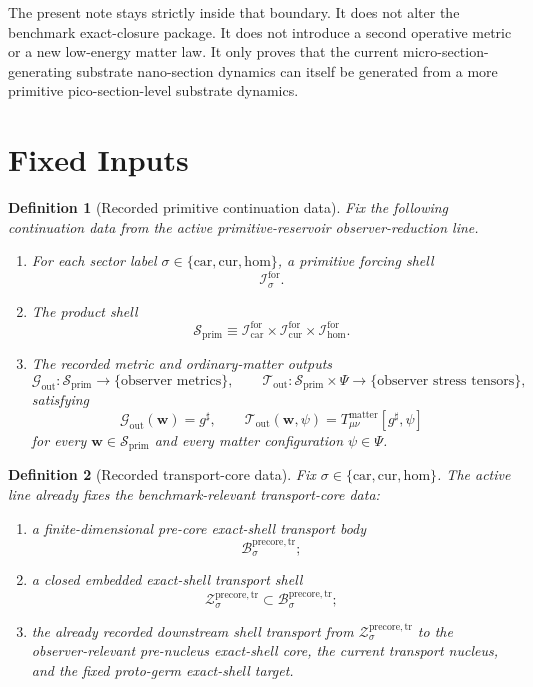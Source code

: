 \documentclass[11pt]{article}
\newcommand{\CompletedMetric}{g^{\sharp}}
\newcommand{\MatterSpace}{\Psi}
\newcommand{\Car}{\mathrm{car}}
\newcommand{\Cur}{\mathrm{cur}}
\newcommand{\Hom}{\mathrm{hom}}
\newcommand{\ForSpace}[1]{\mathcal I_{#1}^{\mathrm{for}}}
\newcommand{\PrimShell}{\mathcal S_{\mathrm{prim}}}
\newcommand{\MetricOut}{\mathscr G_{\mathrm{out}}}
\newcommand{\MatterOut}{\mathscr T_{\mathrm{out}}}
\newcommand{\PreCoreTrBody}[1]{\mathcal B_{#1}^{\mathrm{precore,tr}}}
\newcommand{\PreCoreTrShell}[1]{\mathcal Z_{#1}^{\mathrm{precore,tr}}}
\newtheorem{definition}{Definition}
\begin{document}
The present note stays strictly inside that boundary. It does not alter the benchmark exact-closure package. It does not introduce a second operative metric or a new low-energy matter law. It only proves that the current micro-section-generating substrate nano-section dynamics can itself be generated from a more primitive pico-section-level substrate dynamics.

\section{Fixed Inputs}

\begin{definition}[Recorded primitive continuation data]
\label{def:fixed}
Fix the following continuation data from the active primitive-reservoir observer-reduction line.
\begin{enumerate}
    \item For each sector label \(\sigma\in\{\Car,\Cur,\Hom\}\), a primitive forcing shell
    \[
    \ForSpace{\sigma}.
    \]
    \item The product shell
    \[
    \PrimShell
    \equiv
    \ForSpace{\Car}\times \ForSpace{\Cur}\times \ForSpace{\Hom}.
    \]
    \item The recorded metric and ordinary-matter outputs
    \[
    \MetricOut:\PrimShell\to\{\text{observer metrics}\},
    \qquad
    \MatterOut:\PrimShell\times\MatterSpace\to\{\text{observer stress tensors}\},
    \]
    satisfying
    \begin{equation}
    \MetricOut(\mathbf w)=\CompletedMetric,
    \qquad
    \MatterOut(\mathbf w,\psi)
    =
    T_{\mu\nu}^{\mathrm{matter}}[\CompletedMetric,\psi]
    \label{eq:fixedoutputs}
    \end{equation}
    for every \(\mathbf w\in\PrimShell\) and every matter configuration \(\psi\in\MatterSpace\).
\end{enumerate}
\end{definition}

\begin{definition}[Recorded transport-core data]
\label{def:transport}
Fix \(\sigma\in\{\Car,\Cur,\Hom\}\). The active line already fixes the benchmark-relevant transport-core data:
\begin{enumerate}
    \item a finite-dimensional pre-core exact-shell transport body
    \[
    \PreCoreTrBody{\sigma};
    \]
    \item a closed embedded exact-shell transport shell
    \[
    \PreCoreTrShell{\sigma}\subset\PreCoreTrBody{\sigma};
    \]
    \item the already recorded downstream shell transport from \(\PreCoreTrShell{\sigma}\) to the observer-relevant pre-nucleus exact-shell core, the current transport nucleus, and the fixed proto-germ exact-shell target.
\end{enumerate}
\end{definition}
\end{document}
